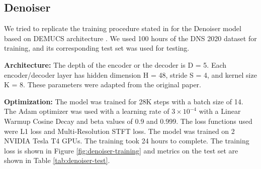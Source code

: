 \subsection{Denoiser}
We tried to replicate the training procedure stated in \cite{defossez2020} for the Denoiser model based on DEMUCS architecture \cite{demucs}. We used 100 hours of the DNS 2020 dataset \cite{reddy2020} for training, and its corresponding test set was used for testing.

\textbf{Architecture:} The depth of the encoder or the decoder is D = 5. Each encoder/decoder layer has hidden dimension H = 48, stride S = 4, and kernel size K = 8. These parameters were adapted from the original paper.

\textbf{Optimization:} The model was trained for 28K steps with a batch size of 14. The Adam \cite{kingma2017adam} optimizer was used with a learning rate of $3\times 10^{-4}$ with a Linear Warmup Cosine Decay and beta values of 0.9 and 0.999. The loss functions used were L1 loss and Multi-Resolution STFT loss.
The model was trained on 2 NVIDIA Tesla T4 GPUs. The training took 24 hours to complete. The training loss is shown in Figure \ref{fig:denoiser-training} and metrics on the test set are shown in Table \ref{tab:denoiser-test}.

